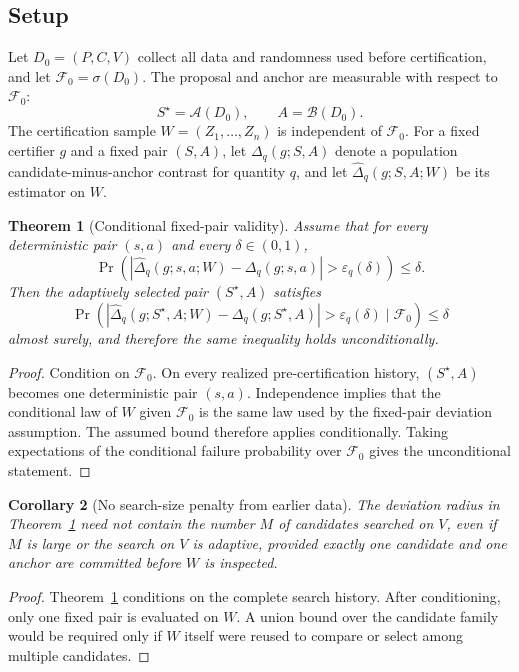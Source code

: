 \documentclass[10pt]{article}
\newtheorem{theorem}{Theorem}[section]
\newtheorem{corollary}[theorem]{Corollary}
\begin{document}
\subsection{Setup}
Let $D_0=(P,C,V)$ collect all data and randomness used before certification, and let $\mathcal F_0=\sigma(D_0)$. The proposal and anchor are measurable with respect to $\mathcal F_0$:
\[
S^\star=\mathcal A(D_0),\qquad A=\mathcal B(D_0).
\]
The certification sample $W=(Z_1,\ldots,Z_n)$ is independent of $\mathcal F_0$. For a fixed certifier $g$ and a fixed pair $(S,A)$, let $\Delta_q(g;S,A)$ denote a population candidate-minus-anchor contrast for quantity $q$, and let $\widehat\Delta_q(g;S,A;W)$ be its estimator on $W$.

\begin{theorem}[Conditional fixed-pair validity]
\label{thm:fixedpair}
Assume that for every deterministic pair $(s,a)$ and every $\delta\in(0,1)$,
\[
\Pr\!\left(
\left|\widehat\Delta_q(g;s,a;W)-\Delta_q(g;s,a)\right|>
\varepsilon_q(\delta)
\right)\le \delta.
\]
Then the adaptively selected pair $(S^\star,A)$ satisfies
\[
\Pr\!\left(
\left|\widehat\Delta_q(g;S^\star,A;W)-\Delta_q(g;S^\star,A)\right|>
\varepsilon_q(\delta)
\mid \mathcal F_0
\right)\le \delta
\]
almost surely, and therefore the same inequality holds unconditionally.
\end{theorem}

\begin{proof}
Condition on $\mathcal F_0$. On every realized pre-certification history, $(S^\star,A)$ becomes one deterministic pair $(s,a)$. Independence implies that the conditional law of $W$ given $\mathcal F_0$ is the same law used by the fixed-pair deviation assumption. The assumed bound therefore applies conditionally. Taking expectations of the conditional failure probability over $\mathcal F_0$ gives the unconditional statement.
\end{proof}

\begin{corollary}[No search-size penalty from earlier data]
\label{cor:searchsize}
The deviation radius in Theorem~\ref{thm:fixedpair} need not contain the number $M$ of candidates searched on $V$, even if $M$ is large or the search on $V$ is adaptive, provided exactly one candidate and one anchor are committed before $W$ is inspected.
\end{corollary}

\begin{proof}
Theorem~\ref{thm:fixedpair} conditions on the complete search history. After conditioning, only one fixed pair is evaluated on $W$. A union bound over the candidate family would be required only if $W$ itself were reused to compare or select among multiple candidates.
\end{proof}
\end{document}

